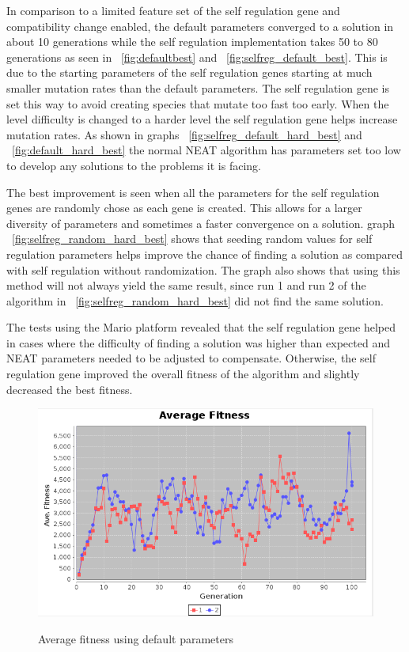 \documentclass[12pt]{ucthesis} \newif\ifpdf \ifx\pdfoutput\undefined
\begin{document}
In comparison to a limited feature set of the self regulation gene and
compatibility change enabled, the default parameters converged to a solution in
about 10 generations while the self regulation implementation takes 50 to 80
generations as seen in ~\ref{fig:defaultbest} and 
~\ref{fig:selfreg_default_best}. This is due to the starting parameters of the
self regulation genes starting at much smaller mutation rates than the default
parameters. The self regulation gene is set this way to avoid creating species
that mutate too fast too early.
When the level difficulty is changed to a harder level the self regulation gene
helps increase mutation rates. As shown in graphs
~\ref{fig:selfreg_default_hard_best} and ~\ref{fig:default_hard_best} the normal
NEAT algorithm has parameters set too low to develop any solutions to the
problems it is facing.

The best improvement is seen when all the parameters for the self regulation
genes are randomly chose as each gene is created. This allows for a larger
diversity of parameters and sometimes a faster convergence on a solution. graph
~\ref{fig:selfreg_random_hard_best} shows that seeding random values for self
regulation parameters helps improve the chance of finding a solution as compared
with self regulation without randomization. The graph also shows that using this
method will not always yield the same result, since run 1 and run 2 of the
algorithm in ~\ref{fig:selfreg_random_hard_best} did not find the same solution.

The tests using the Mario platform revealed that the self regulation gene helped
in cases where the difficulty of finding a solution was higher than expected and
NEAT parameters needed to be adjusted to compensate. Otherwise, the self
regulation gene improved the overall fitness of the algorithm and slightly
decreased the best fitness.

\begin{figure}[h!]
  \caption{Average fitness using default parameters}
  \centering
    \includegraphics[width=1\textwidth]{graphsone/defaultave.png}
   \label{fig:defaultave} 
\end{figure}
\end{document}
